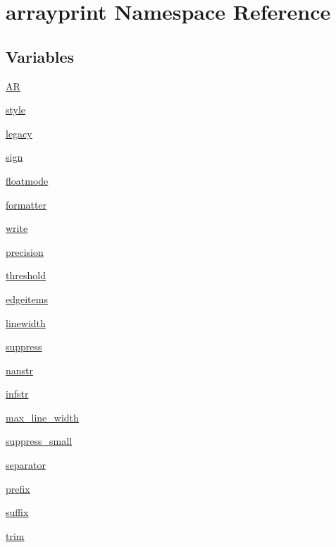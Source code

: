 \hypertarget{namespacearrayprint}{}\section{arrayprint Namespace Reference}
\label{namespacearrayprint}
\subsection*{Variables}
\begin{DoxyCompactItemize}
\item 
\hyperlink{namespacearrayprint_a1fadf0f639096f286eba622a04543762}{AR}
\item 
\hyperlink{namespacearrayprint_a43c96c0ba52a74e5e77c80e15fd307e8}{style}
\item 
\hyperlink{namespacearrayprint_a354c3553676e8987ba5a946a29dcec25}{legacy}
\item 
\hyperlink{namespacearrayprint_a038c0919a91ca3bbaac3928dab4ae217}{sign}
\item 
\hyperlink{namespacearrayprint_a70eca3efa7b761ed26f83015afbaf63a}{floatmode}
\item 
\hyperlink{namespacearrayprint_a7621dc965f6f54d19acd5402285185d2}{formatter}
\item 
\hyperlink{namespacearrayprint_ab51a53aa6eb9cbefc38b4bb01f80fe6f}{write}
\item 
\hyperlink{namespacearrayprint_aec4f2f4c58218c3e441752f6bb6d4ee0}{precision}
\item 
\hyperlink{namespacearrayprint_ae3b6feffb56f54200b57ae4519b931f6}{threshold}
\item 
\hyperlink{namespacearrayprint_ad95f8b230a32efa0d437577ec3e321d6}{edgeitems}
\item 
\hyperlink{namespacearrayprint_ad2d3e2249d60e96f32dc5ef6b7b94db6}{linewidth}
\item 
\hyperlink{namespacearrayprint_a866fc687dd26ef75ce1e026ac98e79f5}{suppress}
\item 
\hyperlink{namespacearrayprint_a9301bc0297f60f060bdad77480b471df}{nanstr}
\item 
\hyperlink{namespacearrayprint_a3b753a9afa6ac70d5ed900700fa3f2f4}{infstr}
\item 
\hyperlink{namespacearrayprint_a7ac366d878a0b87910091dba405fcd4b}{max\+\_\+line\+\_\+width}
\item 
\hyperlink{namespacearrayprint_a7bdcc0c0d42804042a5dc2b0b6077937}{suppress\+\_\+small}
\item 
\hyperlink{namespacearrayprint_adaf913a3e3e5e6100a733d0f88cd3ca8}{separator}
\item 
\hyperlink{namespacearrayprint_a9f4ec8cd0c989da5fd4417ba8e5d805b}{prefix}
\item 
\hyperlink{namespacearrayprint_ae99d227183862d59185ef2c51671ddbf}{suffix}
\item 
\hyperlink{namespacearrayprint_a161c4b5145e040ce994add1fd7831736}{trim}
\end{DoxyCompactItemize}


